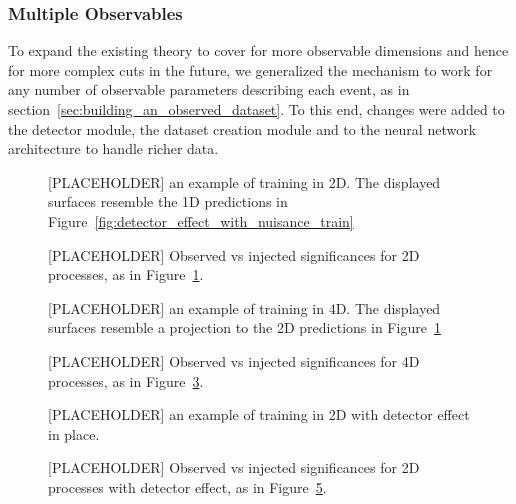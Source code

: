 \documentclass[../../ddppaper2.tex]{subfiles}
\begin{document}
\subsubsection{Multiple Observables}

To expand the existing theory to cover for more observable dimensions and hence for more complex cuts in the future, we generalized the mechanism to work for any number of observable parameters describing each event, as in section~\ref{sec:building_an_observed_dataset}. To this end, changes were added to the detector module, the dataset creation module and to the neural network architecture to handle richer data.

\begin{figure}
    \centering
    \placeholdergraphic
    \caption{[PLACEHOLDER] an example of training in 2D. The displayed surfaces resemble the 1D predictions in Figure~\ref{fig:detector_effect_with_nuisance_train}}
    \label{fig:2d_train}
\end{figure}

\begin{figure}
    \centering
    \placeholdergraphic
    \caption{[PLACEHOLDER] Observed vs injected significances for 2D processes, as in Figure~\ref{fig:2d_train}.}
    \label{fig:2d_significances}
\end{figure}

\begin{figure}
    \centering
    \placeholdergraphic
    \caption{[PLACEHOLDER] an example of training in 4D. The displayed surfaces resemble a projection to the 2D predictions in Figure~\ref{fig:2d_train}}
    \label{fig:4d_train}
\end{figure}

\begin{figure}
    \centering
    \placeholdergraphic
    \caption{[PLACEHOLDER] Observed vs injected significances for 4D processes, as in Figure~\ref{fig:4d_train}.}
    \label{fig:4d_significances}
\end{figure}

\begin{figure}
    \centering
    \placeholdergraphic
    \caption{[PLACEHOLDER] an example of training in 2D with detector effect in place.}
    \label{fig:2d_train_with_detector_effect}
\end{figure}

\begin{figure}
    \centering
    \placeholdergraphic
    \caption{[PLACEHOLDER] Observed vs injected significances for 2D processes with detector effect, as in Figure~\ref{fig:2d_train_with_detector_effect}.}
    \label{fig:2d_with_detector_effect_significances}
\end{figure}
\end{document}
